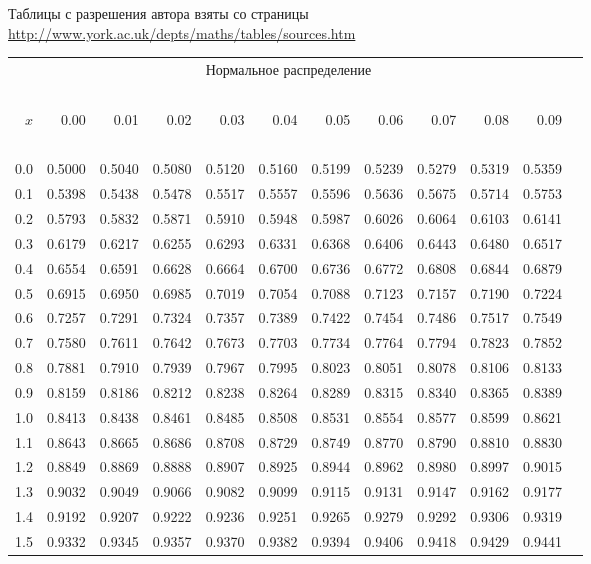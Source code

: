 
Таблицы с разрешения автора взяты со страницы \\
\url{http://www.york.ac.uk/depts/maths/tables/sources.htm}

\newpage

{\footnotesize

\begin{center}
\begin{tabular}{rr@{\ }r@{\ }r@{\ }r@{\ }r@{\ }r@{\ }r@{\ }r@{\ }r@{\ }r@{\ }r}
\multicolumn{11}{c}{Нормальное распределение}\\
\ \\
$x$& 0.00&0.01&0.02&0.03&0.04&0.05&0.06&0.07&0.08&0.09\\
\ \\
0.0&0.5000&0.5040&0.5080&0.5120&0.5160&0.5199&0.5239&0.5279&0.5319&0.5359\\
0.1&0.5398&0.5438&0.5478&0.5517&0.5557&0.5596&0.5636&0.5675&0.5714&0.5753\\
0.2&0.5793&0.5832&0.5871&0.5910&0.5948&0.5987&0.6026&0.6064&0.6103&0.6141\\
0.3&0.6179&0.6217&0.6255&0.6293&0.6331&0.6368&0.6406&0.6443&0.6480&0.6517\\
0.4&0.6554&0.6591&0.6628&0.6664&0.6700&0.6736&0.6772&0.6808&0.6844&0.6879\\
0.5&0.6915&0.6950&0.6985&0.7019&0.7054&0.7088&0.7123&0.7157&0.7190&0.7224\\
0.6&0.7257&0.7291&0.7324&0.7357&0.7389&0.7422&0.7454&0.7486&0.7517&0.7549\\
0.7&0.7580&0.7611&0.7642&0.7673&0.7703&0.7734&0.7764&0.7794&0.7823&0.7852\\
0.8&0.7881&0.7910&0.7939&0.7967&0.7995&0.8023&0.8051&0.8078&0.8106&0.8133\\
0.9&0.8159&0.8186&0.8212&0.8238&0.8264&0.8289&0.8315&0.8340&0.8365&0.8389\\
1.0&0.8413&0.8438&0.8461&0.8485&0.8508&0.8531&0.8554&0.8577&0.8599&0.8621\\
1.1&0.8643&0.8665&0.8686&0.8708&0.8729&0.8749&0.8770&0.8790&0.8810&0.8830\\
1.2&0.8849&0.8869&0.8888&0.8907&0.8925&0.8944&0.8962&0.8980&0.8997&0.9015\\
1.3&0.9032&0.9049&0.9066&0.9082&0.9099&0.9115&0.9131&0.9147&0.9162&0.9177\\
1.4&0.9192&0.9207&0.9222&0.9236&0.9251&0.9265&0.9279&0.9292&0.9306&0.9319\\
1.5&0.9332&0.9345&0.9357&0.9370&0.9382&0.9394&0.9406&0.9418&0.9429&0.9441\\

\end{tabular}
\end{center}}
